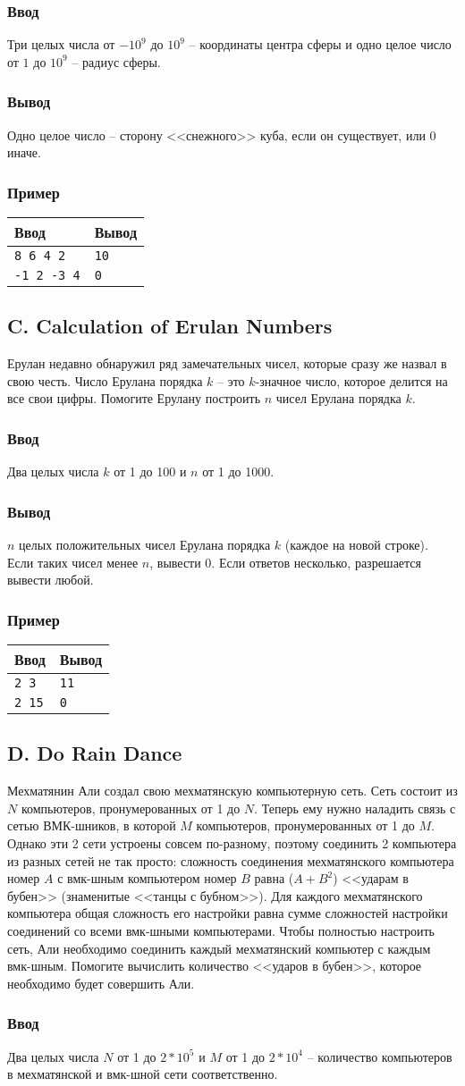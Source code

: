 \documentclass[10pt, a4paper]{article}
\newcommand{\informat}[1]
{
	\subsubsection*{Ввод} #1
}
\newcommand{\outformat}[1]
{
	\subsubsection*{Вывод} #1
}
\newcommand{\examplee}[4]
{
	\subsubsection*{Пример}
	\noindent
	\begin{center}
	\begin{tabularx}{\linewidth}{|X|X|}
	\hline
	Ввод 	& Вывод  	\\
	\hline
	{\tt #1} & {\tt #2}	\\
	\hline
	{\tt #3} & {\tt #4}	\\
	\hline
	\end{tabularx}
	\end{center}
}
\begin{document}
\informat{Три целых числа от $-10^9$ до $10^9$ -- координаты центра сферы и одно целое число от $1$ до $10^9$ -- радиус сферы.}

\outformat{Одно целое число -- сторону <<снежного>> куба, если он существует, или 0 иначе.}

\examplee{8 6 4 2}{10}{-1 2 -3 4}{0}



\subsection*{C. Calculation of Erulan Numbers}

Ерулан недавно обнаружил ряд замечательных чисел, которые сразу же назвал в свою честь. Число Ерулана порядка $k$ -- это $k$-значное число, которое делится на все свои цифры. Помогите Ерулану построить $n$ чисел Ерулана порядка $k$.

\informat{Два целых числа $k$ от 1 до 100 и $n$ от 1 до 1000.}

\outformat{$n$ целых положительных чисел Ерулана порядка $k$ (каждое на новой строке). Если таких чисел менее $n$, вывести 0. Если ответов несколько, разрешается вывести любой.}

\examplee{2 3}{11\newline 12\newline 15}{2 15}{0}



\subsection*{D. Do Rain Dance}

Мехматянин Али создал свою мехматянскую компьютерную сеть. Сеть состоит из $N$ компьютеров, пронумерованных от 1 до $N$. Теперь ему нужно наладить связь с сетью ВМК-шников, в которой $M$ компьютеров, пронумерованных от 1 до $M$. Однако эти 2 сети устроены совсем по-разному, поэтому соединить 2 компьютера из разных сетей не так просто: сложность соединения мехматянского компьютера номер $A$ с вмк-шным компьютером номер $B$ равна ($A+B^2$) <<ударам в бубен>> (знаменитые <<танцы с бубном>>). Для каждого мехматянского компьютера общая сложность его настройки равна сумме сложностей настройки соединений со всеми вмк-шными компьютерами. Чтобы полностью настроить сеть, Али необходимо соединить каждый мехматянский компьютер с каждым вмк-шным. Помогите вычислить количество <<ударов в бубен>>, которое необходимо будет совершить Али.

\informat{Два целых числа $N$ от 1 до $2*10^5$ и $M$ от 1 до $2*10^4$ -- количество компьютеров в мехматянской и вмк-шной сети соответственно.}
\end{document}
